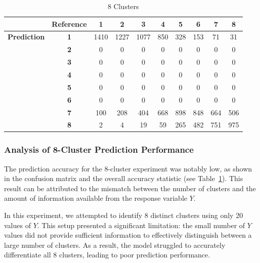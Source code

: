 \documentclass{article}
\begin{document}
\begin{table}[htbp!]
  \vspace{1em} %

  \begin{minipage}{0.8\textwidth}
    \centering
    \begin{tabular}{c|c|c|c|c|c|c|c|c|c}
      & \textbf{Reference} & \textbf{1} & \textbf{2} & \textbf{3} & \textbf{4} & \textbf{5} & \textbf{6} & \textbf{7} & \textbf{8} \\
      \hline
      \textbf{Prediction} & \textbf{1} & 1410 & 1227 & 1077 & 850 & 328 & 153 & 71 & 31 \\
                          & \textbf{2} & 0 & 0 & 0 & 0 & 0 & 0 & 0 & 0 \\
                          & \textbf{3} & 0 & 0 & 0 & 0 & 0 & 0 & 0 & 0 \\
                          & \textbf{4} & 0 & 0 & 0 & 0 & 0 & 0 & 0 & 0 \\
                          & \textbf{5} & 0 & 0 & 0 & 0 & 0 & 0 & 0 & 0 \\
                          & \textbf{6} & 0 & 0 & 0 & 0 & 0 & 0 & 0 & 0 \\
                          & \textbf{7} & 100 & 208 & 404 & 668 & 898 & 848 & 664 & 506 \\
                          & \textbf{8} & 2 & 4 & 19 & 59 & 265 & 482 & 751 & 975 \\
    \end{tabular}
    \caption{8 Clusters}
    \label{tab:8_clu}
  \end{minipage}

\end{table}

\subsubsection{Analysis of 8-Cluster Prediction Performance}

The prediction accuracy for the 8-cluster experiment was notably low, as shown in the confusion matrix and the overall accuracy statistic (see Table~\ref{tab:8_clu}). This result can be attributed to the mismatch between the number of clusters and the amount of information available from the response variable \(Y\).

In this experiment, we attempted to identify 8 distinct clusters using only 20 values of \(Y\). This setup presented a significant limitation: the small number of \(Y\) values did not provide sufficient information to effectively distinguish between a large number of clusters. As a result, the model struggled to accurately differentiate all 8 clusters, leading to poor prediction performance.
\end{document}
